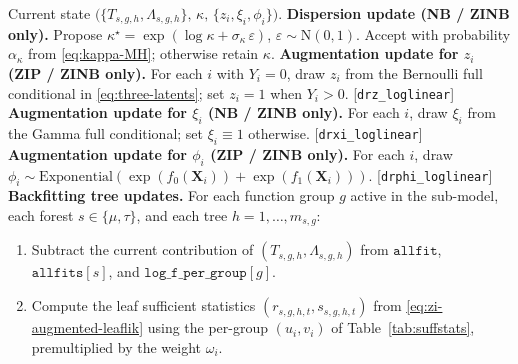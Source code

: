 \documentclass[11pt]{article}
\theoremstyle{plain}
\theoremstyle{definition}
\theoremstyle{remark}
\newcommand{\N}{\mathrm{N}}
\newcommand{\Exp}{\mathrm{Exponential}}
\newcommand{\X}{\mathbf{X}}
\newcommand{\fzeroSym}{f_{0}}
\newcommand{\foneSym}{f_{1}}
\newcommand{\zilat}{z_{i}}
\newcommand{\xilat}{\xi_{i}}
\newcommand{\philat}{\phi_{i}}
\newcommand{\omegai}{\omega_{i}}
\begin{document}
\begin{algorithm}[t]
\caption{CountBCF: one MCMC sweep. Indices $s \in \{\mu, \tau\}$
range over forests, $g \in \{0\}$ in the count sub-model and
$g \in \{0, 1, 2\}$ in the ZI sub-model, and $h = 1, \dots, m_{s, g}$
over the trees of forest $(s, g)$. The BCF weight is $\omegai = 1$
for $s = \mu$ and $\omegai = Z_i$ for $s = \tau$. Latent updates that
are not applicable to the active sub-model are skipped.}
\label{alg:countbcf}
\begin{algorithmic}[1]
  \Require Current state
  $\bigl(\{T_{s,g,h}, \Lambda_{s,g,h}\},\, \kappa,\,
         \{\zilat, \xilat, \philat\}\bigr)$.
  \Statex
  \State \textbf{Dispersion update (NB / ZINB only).}
         Propose $\kappa^\star = \exp(\log \kappa + \sigma_\kappa\,
         \varepsilon)$, $\varepsilon \sim \N(0, 1)$. Accept with
         probability $\alpha_\kappa$ from \eqref{eq:kappa-MH}; otherwise
         retain $\kappa$.
  \Statex
  \State \textbf{Augmentation update for $\zilat$ (ZIP / ZINB only).}
         For each $i$ with $Y_i = 0$, draw $\zilat$ from the Bernoulli
         full conditional in \eqref{eq:three-latents}; set $\zilat = 1$
         when $Y_i > 0$. [\texttt{drz\_loglinear}]
  \Statex
  \State \textbf{Augmentation update for $\xilat$ (NB / ZINB only).}
         For each $i$, draw $\xilat$ from the Gamma full conditional;
         set $\xilat \equiv 1$ otherwise.
         [\texttt{drxi\_loglinear}]
  \Statex
  \State \textbf{Augmentation update for $\philat$ (ZIP / ZINB only).}
         For each $i$, draw
         $\philat \sim \Exp(\exp(\fzeroSym(\X_i)) +
         \exp(\foneSym(\X_i)))$.
         [\texttt{drphi\_loglinear}]
  \Statex
  \State \textbf{Backfitting tree updates.}
         For each function group $g$ active in the sub-model, each
         forest $s \in \{\mu, \tau\}$, and each tree $h = 1, \dots,
         m_{s, g}$:
         \begin{enumerate}[label*=5.\arabic*, leftmargin=*, topsep=2pt, itemsep=2pt]
            \item Subtract the current contribution of
                  $(T_{s,g,h}, \Lambda_{s,g,h})$ from
                  $\mathtt{allfit}$, $\mathtt{allfits}[s]$, and
                  $\mathtt{log\_f\_per\_group}[g]$.
            \item Compute the leaf sufficient statistics
                  $(r_{s, g, h, t}, s_{s, g, h, t})$ from
                  \eqref{eq:zi-augmented-leaflik} using the per-group
                  $(u_i, v_i)$ of Table~\ref{tab:suffstats},
                  premultiplied by the weight $\omegai$.

\end{enumerate}
\end{algorithmic}
\end{algorithm}
\end{document}
